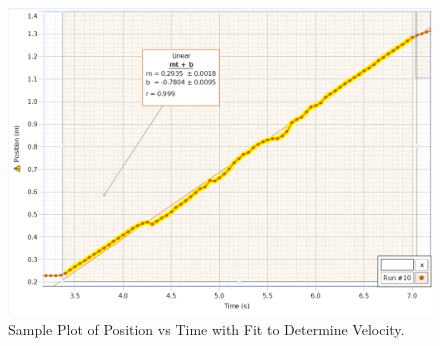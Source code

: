 \documentclass[12pt]{article}
\begin{document}
        \begin{figure}[h]
            \centering
            \includegraphics[width=\linewidth]{fit.png}
            \caption{Sample Plot of Position vs Time with Fit to Determine Velocity.}
        \end{figure}
        \pagebreak
\end{document}
